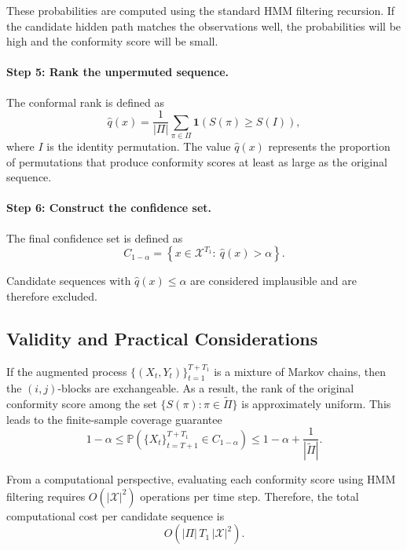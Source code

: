 \documentclass{article}
\begin{document}
These probabilities are computed using the standard HMM filtering recursion. If the candidate hidden path matches the observations well, the probabilities will be high and the conformity score will be small.

\paragraph{Step 5: Rank the unpermuted sequence.}
The conformal rank is defined as
\begin{equation}
\widehat{q}(x)
=
\frac{1}{|\Pi|}\sum_{\pi\in\Pi}\mathbf{1}\!\left(S(\pi)\ge S(I)\right),
\label{eq:qhat}
\end{equation}
where $I$ is the identity permutation. The value $\widehat{q}(x)$ represents the proportion of permutations that produce conformity scores at least as large as the original sequence.

\paragraph{Step 6: Construct the confidence set.}
The final confidence set is defined as
\begin{equation}
C_{1-\alpha}
=
\left\{
x\in\mathcal{X}^{T_1}:\ \widehat{q}(x)>\alpha
\right\}.
\label{eq:confidence_set}
\end{equation}

Candidate sequences with $\widehat{q}(x)\le\alpha$ are considered implausible and are therefore excluded.

\subsection{Validity and Practical Considerations}

If the augmented process $\{(X_t,Y_t)\}_{t=1}^{T+T_1}$ is a mixture of Markov chains, then the $(i,j)$-blocks are exchangeable. As a result, the rank of the original conformity score among the set $\{S(\pi):\pi\in\widetilde{\Pi}\}$ is approximately uniform. This leads to the finite-sample coverage guarantee
\begin{equation}
1-\alpha
\le
\mathbb{P}\!\left(\{X_t\}_{t=T+1}^{T+T_1}\in C_{1-\alpha}\right)
\le
1-\alpha+\frac{1}{|\widetilde{\Pi}|}.
\label{eq:validity}
\end{equation}

From a computational perspective, evaluating each conformity score using HMM filtering requires $O(|\mathcal{X}|^2)$ operations per time step. Therefore, the total computational cost per candidate sequence is
\[
O(|\Pi|\,T_1\,|\mathcal{X}|^2).
\]
\end{document}
